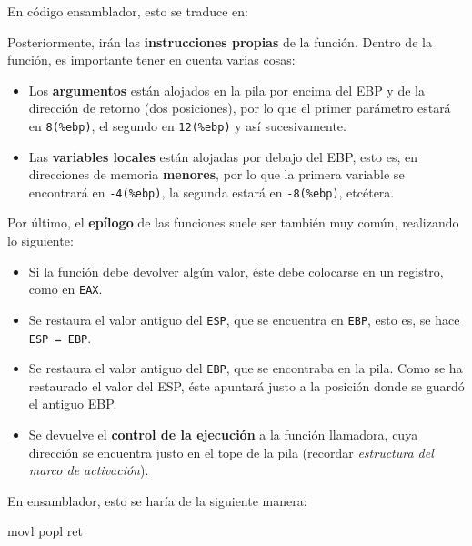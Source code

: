 \documentclass[11pt]{scrartcl}
\begin{document}
En código ensamblador, esto se traduce en:


Posteriormente, irán las \textbf{instrucciones propias} de la función. Dentro de la
función, es importante tener en cuenta varias cosas:
\begin{itemize}
\item Los \textbf{argumentos} están alojados en la pila por encima del EBP y de la
  dirección de retorno (dos posiciones), por lo que el primer parámetro estará
  en \texttt{8(\%ebp)}, el segundo en \texttt{12(\%ebp)} y así sucesivamente.
\item Las \textbf{variables locales} están alojadas por debajo del EBP, esto es,
  en direcciones de memoria \textbf{menores}, por lo que la primera variable se
  encontrará en \texttt{-4(\%ebp)}, la segunda estará en \texttt{-8(\%ebp)},
  etcétera.
\end{itemize}

\medskip

Por último, el \textbf{epílogo} de las funciones suele ser también muy común, realizando
lo siguiente:

\begin{itemize}
\item Si la función debe devolver algún valor, éste debe colocarse en un
  registro, como en \texttt{EAX}.
\item Se restaura el valor antiguo del \texttt{ESP}, que se encuentra en
  \texttt{EBP}, esto es, se hace \texttt{ESP = EBP}.
\item Se restaura el valor antiguo del \texttt{EBP}, que se encontraba en la
  pila. Como se ha restaurado el valor del ESP, éste apuntará justo a la
  posición donde se guardó el antiguo EBP.
\item Se devuelve el \textbf{control de la ejecución} a la función llamadora,
  cuya dirección se encuentra justo en el tope de la pila (recordar
  \textit{estructura del marco de activación}).
\end{itemize}

En ensamblador, esto se haría de la siguiente manera:

\begin{gascode}
    movl  %
    popl  %
    ret
\end{gascode}
\end{document}
